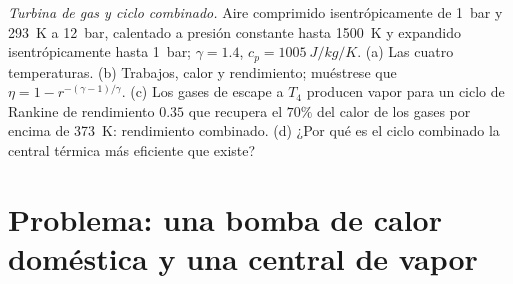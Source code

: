 \begin{exercise}[$\star\star\star$]\label{exo:b2:open-systems:12}
\emph{Turbina de gas y ciclo combinado.} Aire comprimido isentrópicamente
de \qty{1}{bar} y \qty{293}{K} a \qty{12}{bar}, calentado a presión constante
hasta \qty{1500}{K} y expandido isentrópicamente hasta \qty{1}{bar}; $\gamma = 1.4$,
$c_p = \qty{1005}{J/kg/K}$. (a) Las cuatro temperaturas. (b) Trabajos,
calor y rendimiento; muéstrese que $\eta = 1 - r^{-(\gamma - 1)/\gamma}$. (c) Los
gases de escape a $T_4$ producen vapor para un ciclo de Rankine de rendimiento $0.35$
que recupera el $70\%$ del calor de los gases por encima de \qty{373}{K}: rendimiento
combinado. (d) ¿Por qué es el ciclo combinado la central térmica más eficiente
que existe?
\end{exercise}

\section{Problema: una bomba de calor doméstica y una central de vapor}


